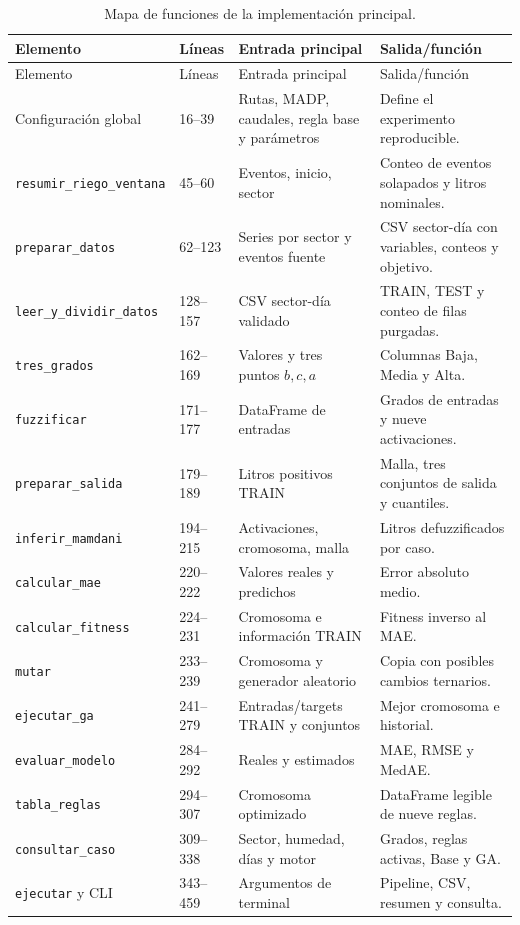 \documentclass[11pt,letterpaper]{article}
\newcommand{\codigo}[1]{\texttt{\small #1}}
\begin{document}
\begin{longtable}{p{4.3cm}p{1.6cm}p{4.5cm}p{4.1cm}}
\caption{Mapa de funciones de la implementación principal.}\label{tab:mapa-codigo}\\
\toprule
Elemento & Líneas & Entrada principal & Salida/función\\
\midrule
\endfirsthead
\toprule Elemento & Líneas & Entrada principal & Salida/función\\\midrule
\endhead
Configuración global & 16--39 & Rutas, MADP, caudales, regla base y parámetros & Define el experimento reproducible.\\
\codigo{resumir\_riego\_ventana} & 45--60 & Eventos, inicio, sector & Conteo de eventos solapados y litros nominales.\\
\codigo{preparar\_datos} & 62--123 & Series por sector y eventos fuente & CSV sector-día con variables, conteos y objetivo.\\
\codigo{leer\_y\_dividir\_datos} & 128--157 & CSV sector-día validado & TRAIN, TEST y conteo de filas purgadas.\\
\codigo{tres\_grados} & 162--169 & Valores y tres puntos $b,c,a$ & Columnas Baja, Media y Alta.\\
\codigo{fuzzificar} & 171--177 & DataFrame de entradas & Grados de entradas y nueve activaciones.\\
\codigo{preparar\_salida} & 179--189 & Litros positivos TRAIN & Malla, tres conjuntos de salida y cuantiles.\\
\codigo{inferir\_mamdani} & 194--215 & Activaciones, cromosoma, malla & Litros defuzzificados por caso.\\
\codigo{calcular\_mae} & 220--222 & Valores reales y predichos & Error absoluto medio.\\
\codigo{calcular\_fitness} & 224--231 & Cromosoma e información TRAIN & Fitness inverso al MAE.\\
\codigo{mutar} & 233--239 & Cromosoma y generador aleatorio & Copia con posibles cambios ternarios.\\
\codigo{ejecutar\_ga} & 241--279 & Entradas/targets TRAIN y conjuntos & Mejor cromosoma e historial.\\
\codigo{evaluar\_modelo} & 284--292 & Reales y estimados & MAE, RMSE y MedAE.\\
\codigo{tabla\_reglas} & 294--307 & Cromosoma optimizado & DataFrame legible de nueve reglas.\\
\codigo{consultar\_caso} & 309--338 & Sector, humedad, días y motor & Grados, reglas activas, Base y GA.\\
\codigo{ejecutar} y CLI & 343--459 & Argumentos de terminal & Pipeline, CSV, resumen y consulta.\\
\bottomrule
\end{longtable}
\end{document}
